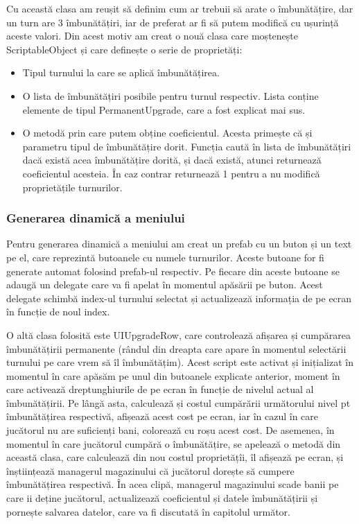 \documentclass[12pt, a4paper]{article}
\begin{document}
	Cu această clasa am reușit să definim cum ar trebuii să arate o îmbunătățire, dar un turn are 3 îmbunătățiri, iar de preferat ar fi să putem modifică cu ușurință aceste valori. Din acest motiv am creat o nouă clasa care moștenește ScriptableObject și care definește o serie de proprietăți:
	
	\begin{itemize}
		\item Tipul turnului la care se aplică îmbunătățirea.
		\item O lista de îmbunătățiri posibile pentru turnul respectiv. Lista conține elemente de tipul PermanentUpgrade, care a fost explicat mai sus.
		\item O metodă prin care putem obține coeficientul. Acesta primește că și parametru tipul de îmbunătățire dorit. Funcția caută în lista de îmbunătățiri dacă există acea îmbunătățire dorită, și dacă există, atunci returnează coeficientul acesteia. În caz contrar returnează 1 pentru a nu modifică proprietățile turnurilor.
	\end{itemize}
	
	\subsubsection{Generarea dinamică a meniului}
	
	Pentru generarea dinamică a meniului am creat un prefab cu un buton și un text pe el, care reprezintă butoanele cu numele turnurilor. Aceste butoane for fi generate automat folosind prefab-ul respectiv. Pe fiecare din aceste butoane se adaugă un delegate care va fi apelat în momentul apăsării pe buton. Acest delegate schimbă index-ul turnului selectat și actualizează informația de pe ecran în funcție de noul index.
	\newline
	
	O altă clasa folosită este UIUpgradeRow, care controlează afișarea și cumpărarea îmbunătățirii permanente (rândul din dreapta care apare în momentul selectării turnului pe care vrem să îl îmbunătățim). Acest script este activat și inițializat în momentul în care apăsăm pe unul din butoanele explicate anterior, moment în care activează dreptunghiurile de pe ecran în funcție de nivelul actual al îmbunătățirii. Pe lângă asta, calculează și costul cumpărării următorului nivel pt îmbunătățirea respectivă, afișează acest cost pe ecran, iar în cazul în care jucătorul nu are suficienți bani, colorează cu roșu acest cost. De asemenea, în momentul în care jucătorul cumpără o îmbunătățire, se apelează o metodă din această clasa, care calculează din nou costul proprietățîi, îl afișează pe ecran, și înștiințează managerul magazinului că jucătorul dorește să cumpere îmbunătățirea respectivă. În acea clipă, managerul magazinului scade banii pe care ii deține jucătorul, actualizează coeficientul și datele îmbunătățirii și pornește salvarea datelor, care va fi discutată în capitolul următor.
	\newline
	
\end{document}
